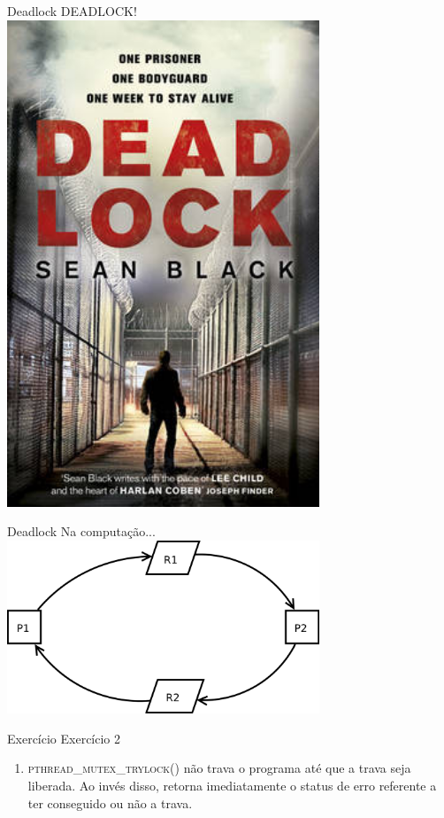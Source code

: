 \documentclass{beamer}
\begin{document}
\begin{frame}[fragile]{Deadlock}
  \centering
  \LARGE
  DEADLOCK!
  \includegraphics[width=0.7\textwidth]{Deadlock2.jpg}
\end{frame}

\begin{frame}[fragile]{Deadlock}
  \centering
  \Large
  Na computação...
  \includegraphics[width=0.7\textwidth]{deadlock_processos.png}
\end{frame}

\begin{frame}[fragile]{Exercício}
  \centering
  \Large
  Exercício 2
  \begin{enumerate}
    \item <2-> \textsc{pthread\_mutex\_trylock()} não trava o programa até que
      a trava seja liberada. Ao invés disso, retorna imediatamente o status de
      erro referente a ter conseguido ou não a trava.
  \end{enumerate}
\end{frame}
\end{document}
